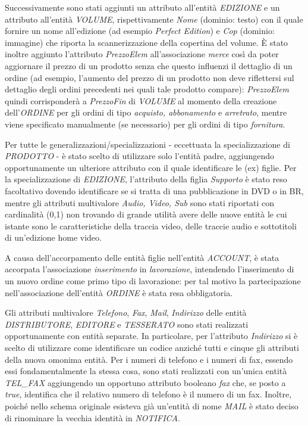 \documentclass[a4paper]{scrartcl}
\begin{document}
\begin{footnotesize}
Successivamente sono stati aggiunti un attributo all'entità \textit{EDIZIONE} e un attributo all'entità \textit{VOLUME}, rispettivamente \textit{Nome} (dominio: testo) con il quale fornire un nome all'edizione (ad esempio \textit{Perfect Edition}) e \textit{Cop} (dominio: immagine) che riporta la scannerizzazione della copertina del volume. È stato inoltre aggiunto l'attributo \textit{PrezzoElem} all'associazione \textit{merce} così da poter aggiornare il prezzo di un prodotto senza che questo influenzi il dettaglio di un ordine (ad esempio, l'aumento del prezzo di un prodotto non deve riflettersi sul dettaglio degli ordini precedenti nei quali tale prodotto compare): \textit{PrezzoElem} quindi corrisponderà a \textit{PrezzoFin} di \textit{VOLUME} al momento della creazione dell'\textit{ORDINE} per gli ordini di tipo \textit{acquisto, abbonamento} e \textit{arretrato}, mentre viene specificato manualmente (se necessario) per gli ordini di tipo \textit{fornitura}.

Per tutte le generalizzazioni/specializzazioni - eccettuata la specializzazione di \textit{PRODOTTO} -  è stato scelto di utilizzare solo l'entità padre, aggiungendo opportunamente un ulteriore attributo con il quale identificare le (ex) figlie. Per la specializzazione di \textit{EDIZIONE}, l'attributo della figlia \textit{Supporto} è stato reso facoltativo dovendo identificare se si tratta di una pubblicazione in DVD o in BR, mentre gli attributi multivalore \textit{Audio, Video, Sub} sono stati riportati con cardinalità (0,1) non trovando di grande utilità avere delle nuove entità le cui istante sono le caratteristiche della traccia video, delle traccie audio e sottotitoli di un'edizione home video.

A causa dell'accorpamento delle entità figlie nell'entità \textit{ACCOUNT}, è stata accorpata l'associazione \textit{inserimento} in \textit{lavorazione}, intendendo l'inserimento di un nuovo ordine come primo tipo di lavorazione: per tal motivo la partecipazione nell'associazione dell'entità \textit{ORDINE} è stata resa obbligatoria.

Gli attributi multivalore \textit{Telefono}, \textit{Fax}, \textit{Mail}, \textit{Indirizzo} delle entità \textit{DISTRIBUTORE}, \textit{EDITORE} e \textit{TESSERATO} sono stati realizzati opportunamente con entità separate. In particolare, per l'attributo \textit{Indirizzo} si è scelto di utilizzare come identificare un codice anziché tutti e cinque gli attributi della nuova omonima entità. Per i numeri di telefono e i numeri di fax, essendo essi fondamentalmente la stessa cosa, sono stati realizzati con un'unica entità \textit{TEL\_{FAX}} aggiungendo un opportuno attributo booleano \textit{fax} che, se posto a \textit{true}, identifica che il relativo numero di telefono è il numero di un fax. Inoltre, poiché nello schema originale esisteva già un'entità di nome \textit{MAIL} è stato deciso di rinominare la vecchia identità in \textit{NOTIFICA}.


\end{footnotesize}
\end{document}

